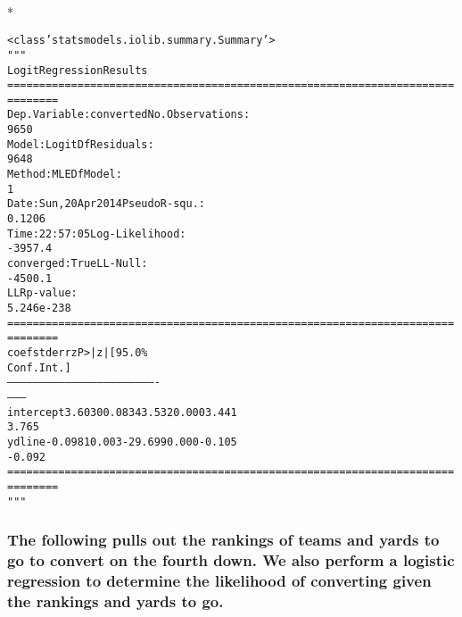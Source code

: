 \documentclass[letterpaper,10pt,english]{/anaconda/lib/python2.7/site-packages/sphinx/texinputs/sphinxhowto}
\def\smaller{\fontsize{9.5pt}{9.5pt}\selectfont}
\newenvironment{InvisibleVerbatim}
        {\begin{mdframed}[leftmargin=0.1\linewidth,innerleftmargin=3pt,innerrightmargin=3pt, userdefinedwidth=1\linewidth, linewidth=0pt, linecolor=white, usetwoside=false]}
        {\end{mdframed}}
\begin{document}
                \makebox[0.1\linewidth]{\smaller\hfill\tt\color{nbframe-out-prompt}Out\hspace{4pt}{[}18{]}:\hspace{4pt}}\\*
                \vspace{-2.55\baselineskip}\begin{InvisibleVerbatim}
                \vspace{-0.5\baselineskip}
\begin{alltt}<class 'statsmodels.iolib.summary.Summary'>
"""
                           Logit Regression Results
======================================================================
========
Dep. Variable:              converted   No. Observations:
9650
Model:                          Logit   Df Residuals:
9648
Method:                           MLE   Df Model:
1
Date:                Sun, 20 Apr 2014   Pseudo R-squ.:
0.1206
Time:                        22:57:05   Log-Likelihood:
-3957.4
converged:                       True   LL-Null:
-4500.1
                                        LLR p-value:
5.246e-238
======================================================================
========
                 coef    std err          z      P>|z|      [95.0\%
Conf. Int.]
----------------------------------------------------------------------
--------
intercept      3.6030      0.083     43.532      0.000         3.441
3.765
ydline        -0.0981      0.003    -29.699      0.000        -0.105
-0.092
======================================================================
========
"""\end{alltt}

            \end{InvisibleVerbatim}
            
        
    


\subsubsection{The following pulls out the rankings of teams and yards to go to convert
on the fourth down. We also perform a logistic regression to determine
the likelihood of converting given the rankings and yards to go.}


    

        
\end{document}
